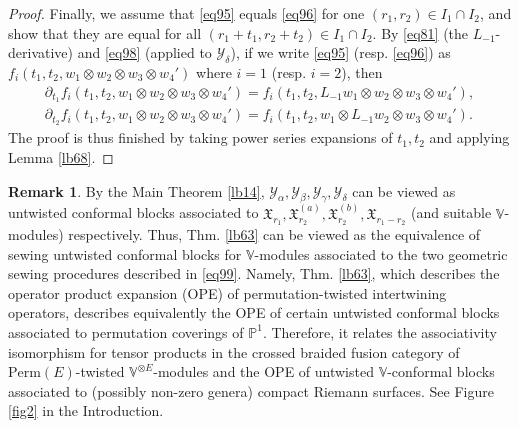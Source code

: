 \documentclass[11pt,b5paper,notitlepage]{article}
\theoremstyle{definition}
\newtheorem{rem}[df]{Remark}
\theoremstyle{plain}
\newcommand{\fk}{\mathfrak}
\newcommand{\mc}{\mathcal}
\newcommand{\Vbb}{\mathbb V}
\newcommand{\Pbb}{\mathbb P}
\newcommand{\Perm}{\mathrm{Perm}}
\numberwithin{equation}{subsection}
\begin{document}
\begin{proof}
Finally, we assume that \eqref{eq95} equals \eqref{eq96} for one $(r_1,r_2)\in I_1\cap I_2$, and show that they are equal for all $(r_1+t_1,r_2+t_2)\in I_1\cap I_2$. By \eqref{eq81}  (the $L_{-1}$-derivative) and \eqref{eq98} (applied to $\mc Y_\delta$), if we write \eqref{eq95} (resp. \eqref{eq96})  as $f_i(t_1,t_2,w_1\otimes w_2\otimes w_3\otimes w_4')$ where $i=1$ (resp. $i=2$), then 
\begin{gather*}
\partial_{t_1}f_i(t_1,t_2,w_1\otimes w_2\otimes w_3\otimes w_4')=f_i(t_1,t_2,L_{-1}w_1\otimes w_2\otimes w_3\otimes w_4'),\\
\partial_{t_2}f_i(t_1,t_2,w_1\otimes w_2\otimes w_3\otimes w_4')=f_i(t_1,t_2,w_1\otimes L_{-1}w_2\otimes w_3\otimes w_4').	
\end{gather*}
The proof is thus finished by taking power series expansions of $t_1,t_2$ and applying Lemma \ref{lb68}.
\end{proof}








\begin{rem}
By the Main Theorem \ref{lb14}, $\mc Y_\alpha,\mc Y_\beta,\mc Y_\gamma,\mc Y_\delta$ can be viewed as untwisted conformal blocks associated to $\fk X_{r_1},\fk X_{r_2}^{(a)},\fk X_{r_2}^{(b)},\fk X_{r_1-r_2}$ (and suitable $\Vbb$-modules) respectively. Thus, Thm. \ref{lb63} can be viewed as the equivalence of sewing untwisted conformal blocks for $\Vbb$-modules associated to the two geometric sewing procedures described in \eqref{eq99}. Namely, Thm. \ref{lb63}, which describes the operator product expansion (OPE) of permutation-twisted intertwining operators, describes equivalently the OPE of certain untwisted conformal blocks associated to permutation coverings of $\Pbb^1$. Therefore, it relates the associativity isomorphism for tensor products in the crossed braided fusion category of  $\Perm(E)$-twisted $\Vbb^{\otimes E}$-modules and the OPE of untwisted $\Vbb$-conformal blocks associated to (possibly non-zero genera) compact Riemann surfaces. See Figure \ref{fig2} in the Introduction.
\end{rem}
\end{document}
